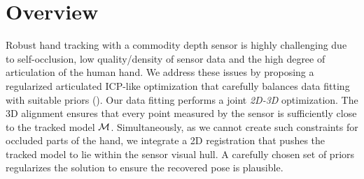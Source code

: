 \section{Overview}
\label{sec:htrack-overview}



Robust hand tracking with a commodity depth sensor is highly challenging due to self-occlusion, low quality/density of sensor data and the high degree of articulation of the human hand.
We address these issues by proposing a regularized articulated ICP-like optimization that carefully balances data fitting with suitable priors (). 
%
Our data fitting performs a joint \emph{2D-3D} optimization. 
The 3D alignment ensures that every point measured by the sensor is sufficiently close to the tracked model $\mathcal{M}$.
Simultaneously, as we cannot create such constraints for occluded parts of the hand, we integrate a 2D registration that pushes the tracked model to lie within the sensor visual hull. A carefully chosen set of priors regularizes the solution to ensure the recovered pose is plausible. 



